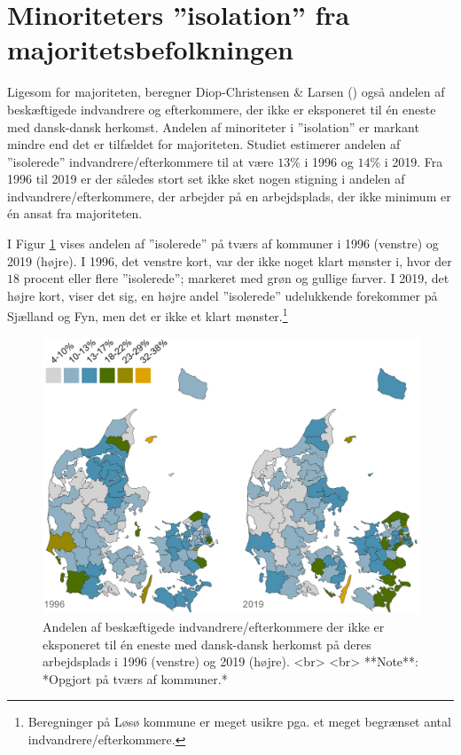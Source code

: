 \documentclass[
]{book}
\begin{document}
\section{Minoriteters ''isolation'' fra majoritetsbefolkningen}\label{minoriteters-isolation-fra-majoritetsbefolkningen}

Ligesom for majoriteten, beregner Diop-Christensen \& Larsen () også andelen af beskæftigede indvandrere og efterkommere, der ikke er eksponeret til én eneste med dansk-dansk herkomst. Andelen af minoriteter i ''isolation'' er markant mindre end det er tilfældet for majoriteten. Studiet estimerer andelen af ''isolerede'' indvandrere/efterkommere til at være \(13\%\) i 1996 og \(14\%\) i 2019. Fra 1996 til 2019 er der således stort set ikke sket nogen stigning i andelen af indvandrere/efterkommere, der arbejder på en arbejdsplads, der ikke minimum er én ansat fra majoriteten.

I Figur \ref{fig:fig-5-6} vises andelen af ''isolerede'' på tværs af kommuner i 1996 (venstre) og 2019 (højre). I 1996, det venstre kort, var der ikke noget klart mønster i, hvor der \(18\) procent eller flere ''isolerede''; markeret med grøn og gullige farver. I 2019, det højre kort, viser det sig, en højre andel ''isolerede'' udelukkende forekommer på Sjælland og Fyn, men det er ikke et klart mønster.\footnote{Beregninger på Løsø kommune er meget usikre pga. et meget begrænset antal indvandrere/efterkommere.}

\begin{figure}
\includegraphics[width=1\linewidth]{images/Figur_4_5} \caption{Andelen af beskæftigede indvandrere/efterkommere der ikke er eksponeret til én eneste med dansk-dansk herkomst på deres arbejdsplads i 1996 (venstre) og 2019 (højre). <br> <br> **Note**: *Opgjort på tværs af kommuner.*}\label{fig:fig-5-6}
\end{figure}
\end{document}

